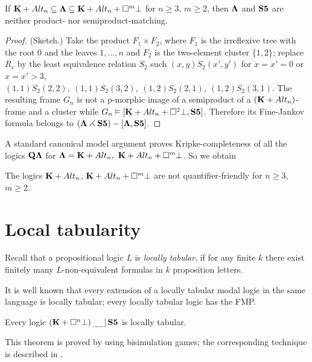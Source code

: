 \documentclass[twoside]{aiml20}
\def\BK{{\bf K}}
\def\BQ{{\bf Q}}
\def\sqr{\square}
\def\bLa{{\bf \Lambda}}
\def\sem0{\,_{\_\!\_\!\_}\!|\,}
\def\sem{\,_{\_\!\_\!\_}\!|\,\bS5}
\def\rtt{\rightthreetimes}
\def\bLa{{\bf \Lambda}}
\def\bS5{{\bf S5}}
\def\mo{\vDash}
\def\sbq{\subseteq}
\def\sqr{\square}
\def\ti{\times}
\begin{document}
{\begin{theorem}\label{Tneg}
  If $\BK+Alt_n\sbq\bLa\sbq\BK+Alt_n+\sqr^m\bot$ for $n\geq 3$,
  $m\geq 2$, then
  $\bLa$ and $\bS5$ are neither product- nor semiproduct-matching.
\end{theorem}

\begin{proof} (Sketch.) Take the product $F_1\ti F_2$, where $F_1$ is
  the irreflexive tree with the root $0$ and the leaves $1,\ldots,n$
  and $F_2$ is the two-element cluster $\{1,2\}$; replace $R_v$ by the
  least equivalence relation $S_2$ such $(x,y)S_2(x',y')$ for $x=x'=0$
  or $x=x'>3$,
  $(1,1)S_2(2,2), ~(1,1)S_2(3,2),~(1,2)S_2(2,1), ~(1,2)S_2(3,1)$. The
  resulting frame $G_n$ is not a p-morphic image of a semiproduct of a
  $(\BK+Alt_n)$-frame and a cluster while
  $G_n\mo [\BK+Alt_n+\sqr^2\bot,\bS5]$. Therefore its Fine-Jankov
  formula belongs to $(\bLa\rtt \bS5)-[\bLa,\bS5]$.
\end{proof}

A standard canonical model argument proves Kripke-completeness
of all the logics $\BQ\bLa$ for $\bLa=\BK+Alt_n,~\BK+Alt_n+\sqr^m\bot$. So we obtain
\begin{corollary}
The logics $\BK+Alt_n$, $\BK+Alt_n+\sqr^m\bot$ are not quantifier-friendly for $n\geq 3$, $m\geq2$.
\end{corollary}





\section{Local tabularity}
Recall that a propositional logic $L$ is {\em locally tabular}, if for
any finite $k$ there exist finitely many $L$-non-equivalent formulas in
$k$ proposition letters.
 
It is well known that every extension of a locally tabular modal logic
in the same language is locally tabular; every locally tabular logic
has the FMP.

\begin{theorem}\label{T81}
Every logic $(\BK+\sqr^n\bot)\sem$ is locally tabular.
\end{theorem}

This theorem is proved by using bisimulation games; the corresponding technique is described in \cite{p42}.


}
\end{document}
